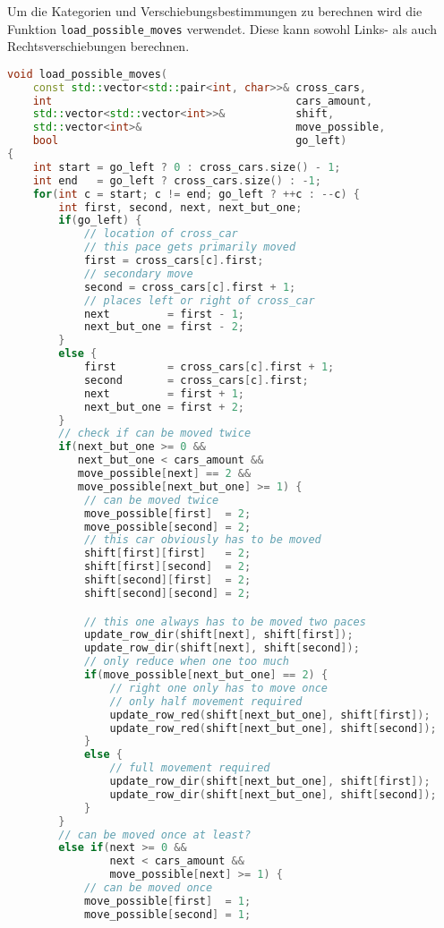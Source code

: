 \documentclass[a4paper,10pt,ngerman]{scrartcl}
\begin{document}
Um die Kategorien und Verschiebungsbestimmungen zu berechnen wird die Funktion \lstinline{load_possible_moves} verwendet.
Diese kann sowohl Links- als auch Rechtsverschiebungen berechnen.
\begin{lstlisting}[language=C++]
void load_possible_moves(
    const std::vector<std::pair<int, char>>& cross_cars,
    int                                      cars_amount,
    std::vector<std::vector<int>>&           shift,
    std::vector<int>&                        move_possible,
    bool                                     go_left)
{
    int start = go_left ? 0 : cross_cars.size() - 1;
    int end   = go_left ? cross_cars.size() : -1;
    for(int c = start; c != end; go_left ? ++c : --c) {
        int first, second, next, next_but_one;
        if(go_left) {
            // location of cross_car
            // this pace gets primarily moved
            first = cross_cars[c].first;
            // secondary move
            second = cross_cars[c].first + 1;
            // places left or right of cross_car
            next         = first - 1;
            next_but_one = first - 2;
        }
        else {
            first        = cross_cars[c].first + 1;
            second       = cross_cars[c].first;
            next         = first + 1;
            next_but_one = first + 2;
        }
        // check if can be moved twice
        if(next_but_one >= 0 &&
           next_but_one < cars_amount &&
           move_possible[next] == 2 &&
           move_possible[next_but_one] >= 1) {
            // can be moved twice
            move_possible[first]  = 2;
            move_possible[second] = 2;
            // this car obviously has to be moved
            shift[first][first]   = 2;
            shift[first][second]  = 2;
            shift[second][first]  = 2;
            shift[second][second] = 2;

            // this one always has to be moved two paces
            update_row_dir(shift[next], shift[first]);
            update_row_dir(shift[next], shift[second]);
            // only reduce when one too much
            if(move_possible[next_but_one] == 2) {
                // right one only has to move once
                // only half movement required
                update_row_red(shift[next_but_one], shift[first]);
                update_row_red(shift[next_but_one], shift[second]);
            }
            else {
                // full movement required
                update_row_dir(shift[next_but_one], shift[first]);
                update_row_dir(shift[next_but_one], shift[second]);
            }
        }
        // can be moved once at least?
        else if(next >= 0 &&
                next < cars_amount &&
                move_possible[next] >= 1) {
            // can be moved once
            move_possible[first]  = 1;
            move_possible[second] = 1;


\end{lstlisting}
\end{document}
